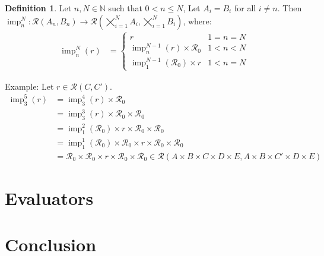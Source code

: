 \documentclass{article}
\theoremstyle{definition}
\newtheorem{definition}{Definition}[subsection]
\theoremstyle{plain}
\def\rule{\mathcal{R}}
\DeclareMathOperator{\imp}{imp}
\begin{document}
\begin{definition}
  Let $ n, N \in \mathbb{N} $ such that $ 0 < n \leq N $,
  Let $ A_i = B_i $ for all $ i \neq n $.
  Then $ \imp_n^N : \rule (A_n, B_n) \rightarrow \rule (\bigtimes_{i=1}^N A_i, \bigtimes_{i=1}^N B_i) $, where:
  \begin{align}
    \imp_n^N (r) & = \begin{cases}
                                     r                       & 1 = n = N \\
                       \imp_n^{N-1} (r)       \times \rule_0 & 1 < n < N \\
                       \imp_1^{N-1} (\rule_0) \times r       & 1 < n = N
                     \end{cases}
  \end{align}
\end{definition}

Example:
Let $ r \in \rule (C, C') $.
\begin{align}
  \imp_3^5 (r) & = \imp_3^4 (r) \times \rule_0 \\
               & = \imp_3^3 (r) \times \rule_0 \times \rule_0 \\
               & = \imp_1^2 (\rule_0) \times r \times \rule_0 \times \rule_0 \\
               & = \imp_1^1 (\rule_0) \times \rule_0 \times r \times \rule_0 \times \rule_0 \\
               & = \rule_0 \times \rule_0 \times r \times \rule_0 \times \rule_0
               \in \rule (A \times B \times C \times D \times E,
               A \times B \times C' \times D \times E)
\end{align}

\section{Evaluators}

\section{Conclusion}
\end{document}
